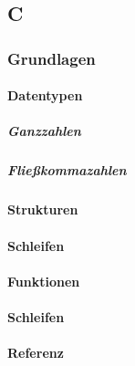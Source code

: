 \subsection{C}
\label{sec:reference:c}

\subsubsection{Grundlagen}

\paragraph{Datentypen}

\subparagraph{Ganzzahlen}



\subparagraph{Fließkommazahlen}

\paragraph{Strukturen}

\paragraph{Schleifen}

\paragraph{Funktionen}

\paragraph{Schleifen}

\paragraph{Referenz}


